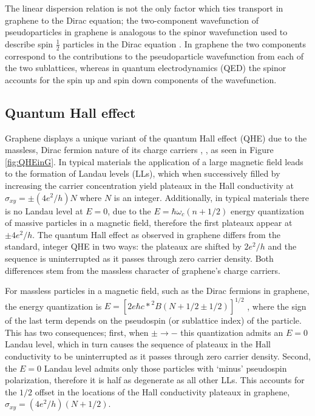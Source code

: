 \documentclass[edeposit,fullpage,draftthesis]{uiucthesis2009}
\begin{document}
    The linear dispersion relation is not the only factor which ties transport in graphene to the Dirac equation; the two-component wavefunction of pseudoparticles in graphene is analogous to the spinor wavefunction used to describe spin $\frac{1}{2}$ particles in the Dirac equation \cite{Katsnelson2006}. In graphene the two components correspond to the contributions to the pseudoparticle wavefunction from each of the two sublattices, whereas in quantum electrodynamics (QED) the spinor accounts for the spin up and spin down components of the wavefunction.

	\subsection{Quantum Hall effect}
    Graphene displays a unique variant of the quantum Hall effect (QHE) due to the massless, Dirac fermion nature of its charge carriers \cite{Novoselov2005}, \cite{Zhang2005}, as seen in Figure \ref{fig:QHEinG}. In typical materials the application of a large magnetic field leads to the formation of Landau levels (LLs), which when successively filled by increasing the carrier concentration yield plateaux in the Hall conductivity at $\sigma_{xy} = \pm (4e^2/h) N$ where $N$ is an integer. Additionally, in typical materials there is no Landau level at $E=0$, due to the $E=\hbar \omega_c (n + 1/2)$ energy quantization of massive particles in a magnetic field, therefore the first plateaux appear at $\pm 4 e^2/h$. The quantum Hall effect as observed in graphene differs from the standard, integer QHE in two ways: the plateaux are shifted by $2 e^2/h$ and the sequence is uninterrupted as it passes through zero carrier density. Both differences stem from the massless character of graphene's charge carriers.

    For massless particles in a magnetic field, such as the Dirac fermions in graphene, the energy quantization is $E = [ 2 e \hbar {c\ast}^2 B (N + 1/2 \pm 1/2) ]^{1/2}$ \cite{Novoselov2005}, where the sign of the last term depends on the pseudospin (or sublattice index) of the particle. This has two consequences; first, when $\pm \rightarrow -$ this quantization admits an $E=0$ Landau level, which in turn causes the sequence of plateaux in the Hall conductivity to be uninterrupted as it passes through zero carrier density. Second, the $E=0$ Landau level admits only those particles with `minus' pseudospin polarization, therefore it is half as degenerate as all other LLs. This accounts for the $1/2$ offset in the locations of the Hall conductivity plateaux in graphene, $\sigma_{xy} = (4 e^2/h )(N + 1/2)$.
\end{document}
